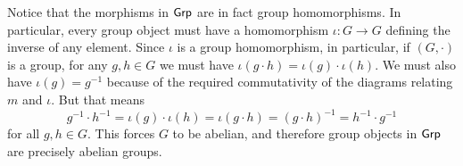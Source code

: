 \begin{solution}
	Notice that the morphisms in $\mathsf{Grp}$ are in fact group homomorphisms. In particular, every group object must have a homomorphism $\iota: G \to G$ defining the inverse of any element. Since $\iota$ is a group homomorphism, in particular, if $(G, \cdot)$ is a group, for any $g, h \in G$ we must have $\iota(g \cdot h) = \iota(g) \cdot \iota(h)$. We must also have $\iota(g) = g^{-1}$ because of the required commutativity of the diagrams relating $m$ and $\iota$. But that means
	\[
		g^{-1} \cdot h^{-1} = \iota(g) \cdot \iota(h) = \iota(g \cdot h) = (g \cdot h)^{-1} = h^{-1} \cdot g^{-1}
	\]
	for all $g, h \in G$. This forces $G$ to be abelian, and therefore group objects in $\mathsf{Grp}$ are precisely abelian groups.
\end{solution}